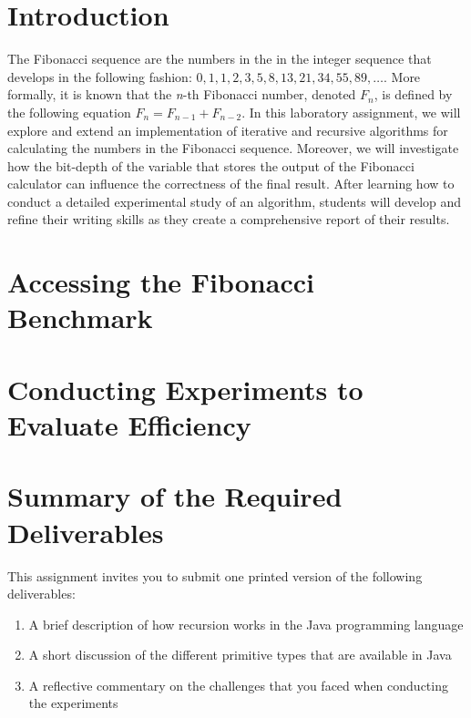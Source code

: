 


\usepackage[compact]{titlesec}


\section*{Introduction}

The Fibonacci sequence are the numbers in the in the integer sequence that develops in the following fashion: $0, 1, 1,
2, 3, 5, 8, 13, 21, 34, 55, 89, \ldots$. More formally, it is known that the {\em n}-th Fibonacci number, denoted $F_n$,
is defined by the following equation $F_n = F_{n-1} + F_{n-2}$. In this laboratory assignment, we will explore and
extend an implementation of iterative and recursive algorithms for calculating the numbers in the Fibonacci sequence.
Moreover, we will investigate how the bit-depth of the variable that stores the output of the Fibonacci calculator can
influence the correctness of the final result. After learning how to conduct a detailed experimental study of an
algorithm, students will develop and refine their writing skills as they create a comprehensive report of their results.

\section*{Accessing the Fibonacci Benchmark}

\section*{Conducting Experiments to Evaluate Efficiency}

\section*{Summary of the Required Deliverables}

  This assignment invites you to submit one printed version of the following deliverables: 

  \begin{enumerate} 

  \item A brief description of how recursion works in the Java programming language

  \item A short discussion of the different primitive types that are available in Java

  \item A reflective commentary on the challenges that you faced when conducting the experiments
   
  \end{enumerate}

